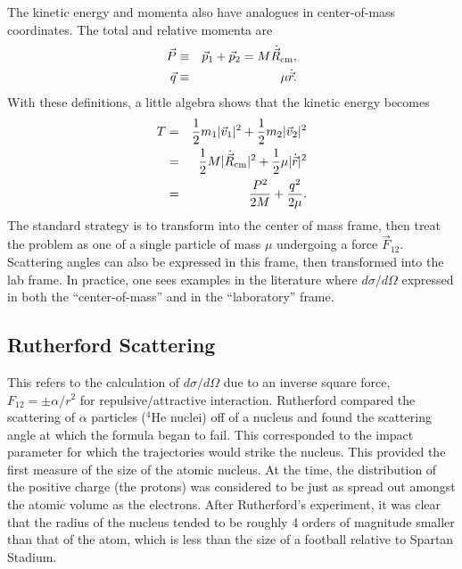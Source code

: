 The kinetic energy and momenta also have analogues in center-of-mass coordinates. The total and relative momenta are
\begin{eqnarray}
\vec{P}&\equiv&\vec{p}_1+\vec{p}_2=M\dot{\vec{R}}_{\rm cm},\\
\nonumber
\vec{q}&\equiv&\mu\dot{\vec{r}}.
\end{eqnarray}
With these definitions, a little algebra shows that the kinetic energy becomes
\begin{eqnarray}
T&=&\frac{1}{2}m_1|\vec{v}_1|^2+\frac{1}{2}m_2|\vec{v}_2|^2\\
\nonumber
&=&\frac{1}{2}M|\dot{\vec{R}}_{\rm cm}|^2
+\frac{1}{2}\mu|\dot{\vec{r}}|^2\\
\nonumber
&=&\frac{P^2}{2M}+\frac{q^2}{2\mu}.
\end{eqnarray}
The standard strategy is to transform into the center of mass frame, then treat the problem as one of a single particle of mass $\mu$ undergoing a force $\vec{F}_{12}$. Scattering angles can also be expressed in this frame, then transformed into the lab frame. In practice, one sees examples in the literature where $d\sigma/d\Omega$ expressed in both the ``center-of-mass'' and in the ``laboratory'' frame. 

\subsection{Rutherford Scattering}

This refers to the calculation of $d\sigma/d\Omega$ due to an inverse square force, $F_{12}=\pm\alpha/r^2$ for repulsive/attractive interaction. Rutherford compared the scattering of $\alpha$ particles ($^4$He nuclei) off of a nucleus and found the scattering angle at which the formula began to fail. This corresponded to the impact parameter for which the trajectories would strike the nucleus. This provided the first measure of the size of the atomic nucleus. At the time, the distribution of the positive charge (the protons) was considered to be just as spread out amongst the atomic volume as the electrons. After Rutherford's experiment, it was clear that the radius of the nucleus tended to be roughly 4 orders of magnitude smaller than that of the atom, which is less than the size of a football relative to Spartan Stadium.


